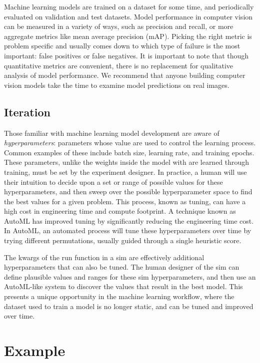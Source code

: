 \documentclass{article}
\begin{document}
Machine learning models are trained on a dataset for some time, and periodically evaluated on validation and test datasets. Model performance in computer vision can be measured in a variety of ways, such as precision and recall, or more aggregate metrics like mean average precision (mAP). Picking the right metric is problem specific and usually comes down to which type of failure is the most important: false positives or false negatives. It is important to note that though quantitative metrics are convenient, there is no replacement for qualitative analysis of model performance. We recommend that anyone building computer vision models take the time to examine model predictions on real images.

\subsection{Iteration}
\label{sec:iteration}

Those familiar with machine learning model development are aware of \emph{hyperparameters}: parameters whose value are used to control the learning process. Common examples of these include batch size, learning rate, and training epochs. These parameters, unlike the weights inside the model with are learned through training, must be set by the experiment designer. In practice, a human will use their intuition to decide upon a set or range of possible values for these hyperparameters, and then sweep over the possible hyperparameter space to find the best values for a given problem. This process, known as tuning, can have a high cost in engineering time and compute footprint. A technique known as AutoML has improved tuning by significantly reducing the engineering time cost. In AutoML, an automated process will tune these hyperparameters over time by trying different permutations, usually guided through a single heuristic score.

The kwargs of the run function in a sim are effectively additional hyperparameters that can also be tuned. The human designer of the sim can define plausible values and ranges for these sim hyperparameters, and then use an AutoML-like system to discover the values that result in the best model. This presents a unique opportunity in the machine learning workflow, where the dataset used to train a model is no longer static, and can be tuned and improved over time.

\section{Example}
\label{sec:example}
\end{document}
